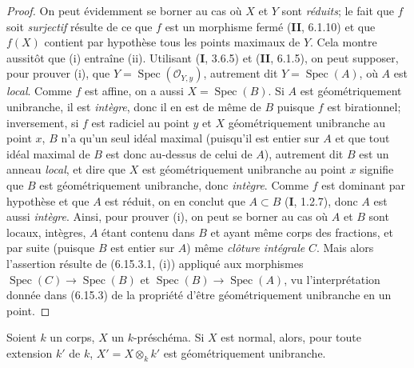 \begin{proof}
On peut évidemment se borner au cas où $X$ et $Y$ sont \emph{réduits}; le fait
que $f$ soit \emph{surjectif} résulte de ce que $f$ est un morphisme fermé (\textbf{II},
6.1.10) et que $f(X)$ contient par hypothèse tous les points maximaux de
$Y$. Cela montre aussitôt que (i) entraîne (ii). Utilisant (\textbf{I}, 3.6.5) et
(\textbf{II}, 6.1.5), on peut supposer, pour prouver (i), que
$Y=\operatorname{Spec}(\mathcal O_{Y,y})$,
autrement dit
$Y=\operatorname{Spec}(A)$, où $A$ est \emph{local}. Comme $f$ est affine, on a
aussi $X=\operatorname{Spec}(B)$. Si $A$ est géométriquement unibranche,
il est \emph{intègre}, donc il en est de même de $B$ puisque $f$ est birationnel;
inversement, si $f$ est radiciel au point $y$ et $X$ géométriquement
unibranche au point $x$, $B$ n'a qu'un seul idéal maximal (puisqu'il est
entier sur $A$ et que tout idéal maximal de $B$ est donc au-dessus de celui
de $A$), autrement dit $B$ est un anneau \emph{local}, et dire que $X$ est
géométriquement unibranche au point $x$ signifie que $B$ est
géométriquement unibranche, donc \emph{intègre}. Comme $f$ est dominant par
hypothèse et que $A$ est réduit, on en conclut que $A\subset B$ (\textbf{I},
1.2.7), donc $A$ est aussi \emph{intègre}. Ainsi, pour prouver (i), on peut se
borner au cas où $A$ et $B$ sont locaux, intègres, $A$ étant contenu dans
$B$ et ayant même corps des fractions, et par suite (puisque $B$ est entier
sur $A$) même \emph{clôture intégrale} $C$. Mais alors l'assertion résulte de
(6.15.3.1, (i)) appliqué aux morphismes
$\operatorname{Spec}(C)\to\operatorname{Spec}(B)$ et
$\operatorname{Spec}(B)\to\operatorname{Spec}(A)$, vu l'interprétation
donnée dans (6.15.3) de la propriété d'être géométriquement unibranche en
un point.
\end{proof}

\begin{proposition}[6.15.6]
\label{IV.2.s6.15.6-fr}
Soient $k$ un corps, $X$ un $k$-préschéma. Si $X$ est normal, alors, pour
toute extension $k'$ de $k$, $X'=X\otimes_k k'$ est géométriquement
unibranche.
\end{proposition}

